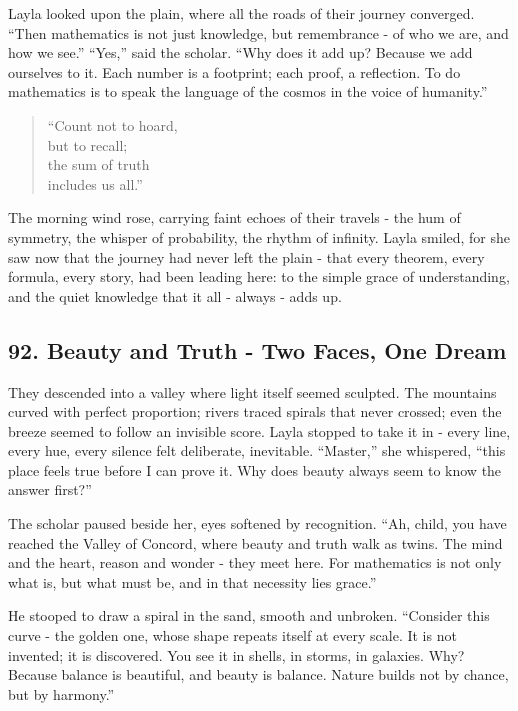 \documentclass[
  letterpaper,
  DIV=11,
  numbers=noendperiod]{scrreprt}
\begin{document}
Layla looked upon the plain, where all the roads of their journey
converged. ``Then mathematics is not just knowledge, but remembrance -
of who we are, and how we see.'' ``Yes,'' said the scholar. ``Why does
it add up? Because we add ourselves to it. Each number is a footprint;
each proof, a reflection. To do mathematics is to speak the language of
the cosmos in the voice of humanity.''

\begin{quote}
``Count not to hoard,\\
but to recall;\\
the sum of truth\\
includes us all.''
\end{quote}

The morning wind rose, carrying faint echoes of their travels - the hum
of symmetry, the whisper of probability, the rhythm of infinity. Layla
smiled, for she saw now that the journey had never left the plain - that
every theorem, every formula, every story, had been leading here: to the
simple grace of understanding, and the quiet knowledge that it all -
always - adds up.

\subsection{92. Beauty and Truth - Two Faces, One
Dream}\label{beauty-and-truth---two-faces-one-dream}

They descended into a valley where light itself seemed sculpted. The
mountains curved with perfect proportion; rivers traced spirals that
never crossed; even the breeze seemed to follow an invisible score.
Layla stopped to take it in - every line, every hue, every silence felt
deliberate, inevitable. ``Master,'' she whispered, ``this place feels
true before I can prove it. Why does beauty always seem to know the
answer first?''

The scholar paused beside her, eyes softened by recognition. ``Ah,
child, you have reached the Valley of Concord, where beauty and truth
walk as twins. The mind and the heart, reason and wonder - they meet
here. For mathematics is not only what is, but what must be, and in that
necessity lies grace.''

He stooped to draw a spiral in the sand, smooth and unbroken. ``Consider
this curve - the golden one, whose shape repeats itself at every scale.
It is not invented; it is discovered. You see it in shells, in storms,
in galaxies. Why? Because balance is beautiful, and beauty is balance.
Nature builds not by chance, but by harmony.''
\end{document}
